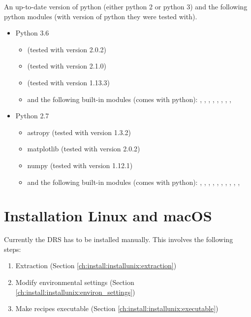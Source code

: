 An up-to-date version of python (either python 2 or python 3) and the following python modules (with version of python they were tested with).
\begin{itemize}
\item Python 3.6
	\begin{itemize}
	\item {} (tested with version 2.0.2)
	\item {} (tested with version 2.1.0)
	\item {} (tested with version 1.13.3)
	\item and the following built-in modules (comes with python): , , , , , , , , 
	\end{itemize}
\item Python 2.7
	\begin{itemize}
	\item astropy (tested with version 1.3.2)
	\item matplotlib (tested with version 2.0.2)
	\item numpy (tested with version 1.12.1)
	\item and the following built-in modules (comes with python): , , , , , , , , , , 
	\end{itemize}
\end{itemize}



\clearpage
\newpage
\section{Installation Linux and macOS}
\label{ch:install:installunix}

Currently the DRS has to be installed manually. This involves the following steps:
\begin{enumerate}
\item Extraction (Section \ref{ch:install:installunix:extraction})
\item Modify environmental settings (Section \ref{ch:install:installunix:environ_settings})
\item Make recipes executable (Section \ref{ch:install:installunix:executable})
\end{enumerate}

